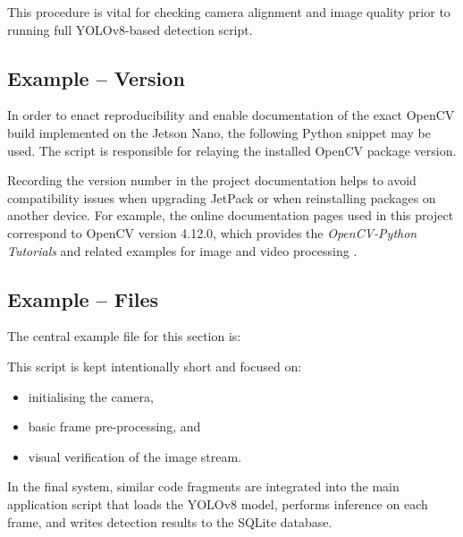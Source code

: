 This procedure is vital for checking camera alignment and image quality prior to running full YOLOv8-based detection script.


\subsection{Example -- Version}

In order to enact reproducibility and enable documentation of the exact OpenCV build implemented on the Jetson Nano, the following Python snippet may be used. The script is responsible for relaying the installed OpenCV package version.



Recording the version number in the project documentation helps to avoid compatibility issues when upgrading JetPack or when reinstalling packages on another device. For example, the online documentation pages used in this project correspond to OpenCV version 4.12.0, which provides the \emph{OpenCV-Python Tutorials} and related examples for image and video processing \cite{opencv_py_tutorial_root}.


\subsection{Example -- Files}

The central example file for this section is:


This script is kept intentionally short and focused on:
\begin{itemize}
	\item initialising the camera,
	\item basic frame pre-processing, and
	\item visual verification of the image stream.
\end{itemize}
In the final system, similar code fragments are integrated into the main application script that loads the YOLOv8 model, performs inference on each frame, and writes detection results to the SQLite database.

